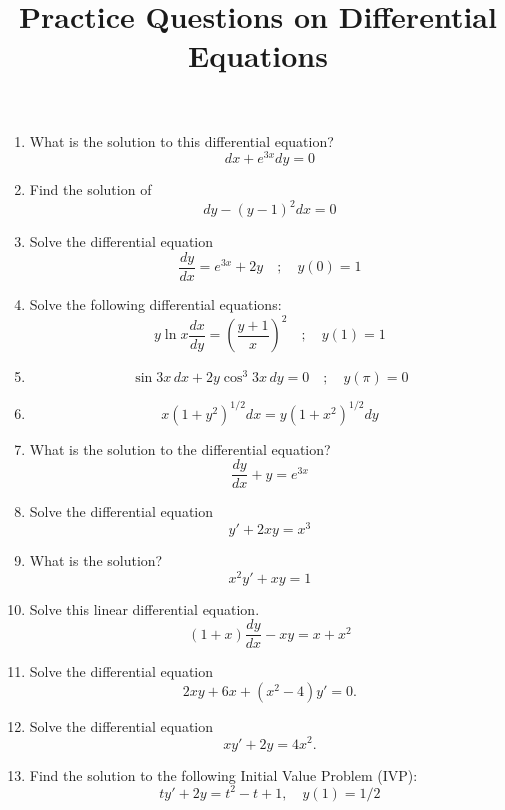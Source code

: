 \documentclass[11pt]{article}
\title{Practice Questions on  Differential Equations}
\author{}
\begin{document}
\maketitle
\thispagestyle{fancy}

\begin{enumerate}

 \item What is the solution to this differential equation?
    \[
    dx + e^{3x} dy = 0
    \]
    
    \item Find the solution of 
    \[
    dy - (y - 1)^2 dx = 0
    \]
    
    \item Solve the differential equation
    \[
    \frac{dy}{dx} = e^{3x} + 2y \quad ; \quad y(0) = 1
    \]
    
    \item Solve the following differential equations:
    \[
    y \ln x \frac{dx}{dy} = \left( \frac{y + 1}{x} \right)^2 \quad ; \quad y(1) = 1
    \]
    
    \item 
    \[
    \sin3 x \, dx + 2y \cos^3 3x \, dy = 0 \quad ; \quad y(\pi) = 0
    \]
    
    \item 
    \[
    x(1 + y^2)^{1/2} dx = y(1 + x^2)^{1/2} dy
    \]
    
    \item What is the solution to the differential equation?
    \[
    \frac{dy}{dx} + y = e^{3x}
    \]
    
    \item Solve the differential equation
    \[
    y' + 2xy = x^3
    \]
    
    \item  What is the solution?
    \[
    x^2 y' + xy = 1
    \]
    
    
    \item Solve this linear differential equation.
    \[
    (1 + x) \frac{dy}{dx} - xy = x + x^2
    \]

\item Solve the differential equation 
\[
2xy + 6x + (x^2 - 4)y' = 0.
\]

\item Solve the differential equation 
\[
xy' + 2y = 4x^2.
\]

\item Find the solution to the following Initial Value Problem (IVP):
\[
t y' + 2y = t^2 - t + 1, \quad y(1) = 1/2
\]


\end{enumerate}
\end{document}
